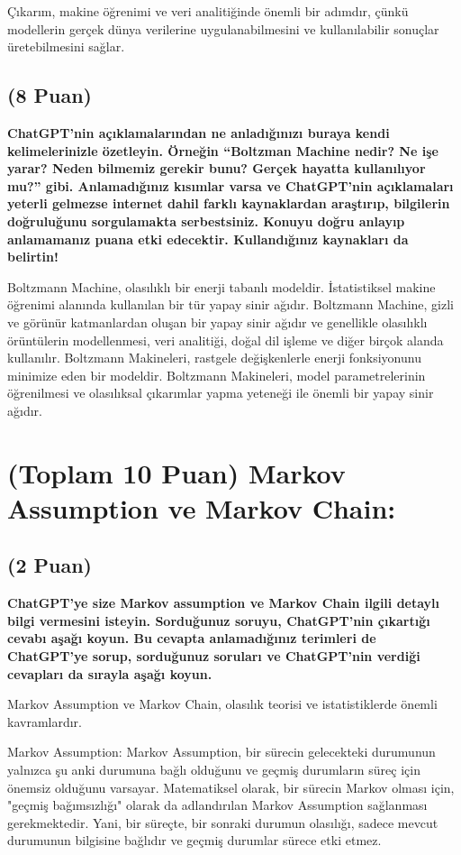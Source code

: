 \documentclass[11pt]{article}
\begin{document}
Çıkarım, makine öğrenimi ve veri analitiğinde önemli bir adımdır, çünkü modellerin gerçek dünya verilerine uygulanabilmesini ve kullanılabilir sonuçlar üretebilmesini sağlar.

\subsection{(8 Puan)} \textbf{ChatGPT’nin açıklamalarından ne anladığınızı buraya kendi kelimelerinizle özetleyin. Örneğin ``Boltzman Machine nedir? Ne işe yarar? Neden bilmemiz gerekir bunu? Gerçek hayatta kullanılıyor mu?'' gibi. Anlamadığınız kısımlar varsa ve ChatGPT’nin açıklamaları yeterli gelmezse internet dahil farklı kaynaklardan araştırıp, bilgilerin doğruluğunu sorgulamakta serbestsiniz. Konuyu doğru anlayıp anlamamanız puana etki edecektir. Kullandığınız kaynakları da belirtin!}

Boltzmann Machine, olasılıklı bir enerji tabanlı modeldir. İstatistiksel makine öğrenimi alanında kullanılan bir tür yapay sinir ağıdır. Boltzmann Machine, gizli ve görünür katmanlardan oluşan bir yapay sinir ağıdır ve genellikle olasılıklı örüntülerin modellenmesi, veri analitiği, doğal dil işleme ve diğer birçok alanda kullanılır. Boltzmann Makineleri, rastgele değişkenlerle enerji fonksiyonunu minimize eden bir modeldir. Boltzmann Makineleri, model parametrelerinin öğrenilmesi ve olasılıksal çıkarımlar yapma yeteneği ile önemli bir yapay sinir ağıdır.

\section{(Toplam 10 Puan) Markov Assumption ve Markov Chain:}

\subsection{(2 Puan)} \textbf{ChatGPT’ye size Markov assumption ve Markov Chain ilgili detaylı bilgi vermesini isteyin. Sorduğunuz soruyu, ChatGPT'nin çıkartığı cevabı aşağı koyun. Bu cevapta anlamadığınız terimleri de ChatGPT’ye sorup, sorduğunuz soruları ve ChatGPT’nin verdiği cevapları da sırayla aşağı koyun.}

Markov Assumption ve Markov Chain, olasılık teorisi ve istatistiklerde önemli kavramlardır.

Markov Assumption: Markov Assumption, bir sürecin gelecekteki durumunun yalnızca şu anki durumuna bağlı olduğunu ve geçmiş durumların süreç için önemsiz olduğunu varsayar. Matematiksel olarak, bir sürecin Markov olması için, "geçmiş bağımsızlığı" olarak da adlandırılan Markov Assumption sağlanması gerekmektedir. Yani, bir süreçte, bir sonraki durumun olasılığı, sadece mevcut durumunun bilgisine bağlıdır ve geçmiş durumlar sürece etki etmez.
\end{document}
